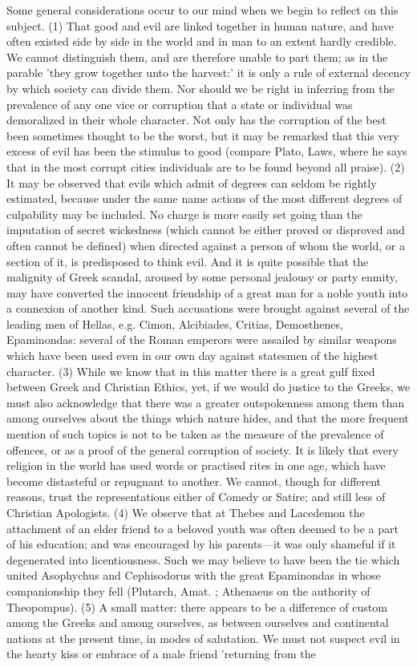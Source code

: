 \documentclass[11pt,letter]{article}
\begin{document}
\par  Some general considerations occur to our mind when we begin to reflect on this subject. (1) That good and evil are linked together in human nature, and have often existed side by side in the world and in man to an extent hardly credible. We cannot distinguish them, and are therefore unable to part them; as in the parable 'they grow together unto the harvest:' it is only a rule of external decency by which society can divide them. Nor should we be right in inferring from the prevalence of any one vice or corruption that a state or individual was demoralized in their whole character. Not only has the corruption of the best been sometimes thought to be the worst, but it may be remarked that this very excess of evil has been the stimulus to good (compare Plato, Laws, where he says that in the most corrupt cities individuals are to be found beyond all praise). (2) It may be observed that evils which admit of degrees can seldom be rightly estimated, because under the same name actions of the most different degrees of culpability may be included. No charge is more easily set going than the imputation of secret wickedness (which cannot be either proved or disproved and often cannot be defined) when directed against a person of whom the world, or a section of it, is predisposed to think evil. And it is quite possible that the malignity of Greek scandal, aroused by some personal jealousy or party enmity, may have converted the innocent friendship of a great man for a noble youth into a connexion of another kind. Such accusations were brought against several of the leading men of Hellas, e.g. Cimon, Alcibiades, Critias, Demosthenes, Epaminondas: several of the Roman emperors were assailed by similar weapons which have been used even in our own day against statesmen of the highest character. (3) While we know that in this matter there is a great gulf fixed between Greek and Christian Ethics, yet, if we would do justice to the Greeks, we must also acknowledge that there was a greater outspokenness among them than among ourselves about the things which nature hides, and that the more frequent mention of such topics is not to be taken as the measure of the prevalence of offences, or as a proof of the general corruption of society. It is likely that every religion in the world has used words or practised rites in one age, which have become distasteful or repugnant to another. We cannot, though for different reasons, trust the representations either of Comedy or Satire; and still less of Christian Apologists. (4) We observe that at Thebes and Lacedemon the attachment of an elder friend to a beloved youth was often deemed to be a part of his education; and was encouraged by his parents—it was only shameful if it degenerated into licentiousness. Such we may believe to have been the tie which united Asophychus and Cephisodorus with the great Epaminondas in whose companionship they fell (Plutarch, Amat. ; Athenaeus on the authority of Theopompus). (5) A small matter: there appears to be a difference of custom among the Greeks and among ourselves, as between ourselves and continental nations at the present time, in modes of salutation. We must not suspect evil in the hearty kiss or embrace of a male friend 'returning from the 
\end{document}
